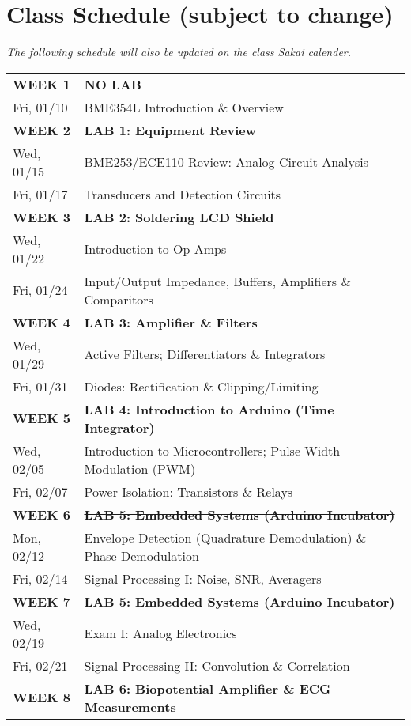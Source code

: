 \section{Class Schedule (subject to change)}
\emph{The following schedule will also be updated on the class Sakai calender.}\\
\begin{tabular}{|l|l|} \hline
{\bf WEEK 1}      &   {\bf NO LAB} \\
Fri, 01/10  &   BME354L Introduction \& Overview \\ \hline
{\bf WEEK 2}      &   {\bf LAB 1: Equipment Review} \\
Wed, 01/15  &   BME253/ECE110 Review: Analog Circuit Analysis\\
Fri, 01/17  &   Transducers and Detection Circuits \\ \hline
{\bf WEEK 3}      &   {\bf LAB 2: Soldering LCD Shield} \\
Wed, 01/22  &   Introduction to Op Amps \\ 
Fri, 01/24  &   Input/Output Impedance, Buffers, Amplifiers \& Comparitors \\ \hline
{\bf WEEK 4}      &   {\bf LAB 3: Amplifier \& Filters} \\
Wed, 01/29  &   Active Filters; Differentiators \& Integrators \\
Fri, 01/31  &   Diodes: Rectification \& Clipping/Limiting \\ \hline
{\bf WEEK 5}      &   {\bf LAB 4: Introduction to Arduino (Time Integrator)} \\
Wed, 02/05  &   Introduction to Microcontrollers; Pulse Width Modulation (PWM)\\
Fri, 02/07  &   Power Isolation: Transistors \& Relays \\ \hline
{\bf WEEK 6}      &   \textbf{\st{LAB 5: Embedded Systems (Arduino Incubator)}} \\
Mon, 02/12  &   Envelope Detection (Quadrature Demodulation) \& Phase Demodulation \\ 
Fri, 02/14  &   Signal Processing I: Noise, SNR, Averagers\\ \hline
{\bf WEEK 7}      &   {\bf LAB 5: Embedded Systems (Arduino Incubator)} \\
Wed, 02/19  &   Exam I: Analog Electronics \\ 
Fri, 02/21  &   Signal Processing II: Convolution \& Correlation\\ \hline
{\bf WEEK 8}      &   {\bf LAB 6: Biopotential Amplifier \& ECG Measurements} \\

\end{tabular}
